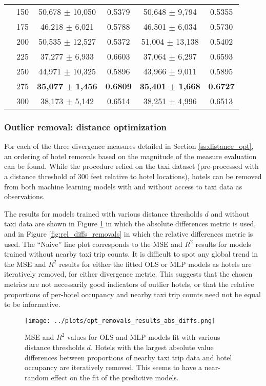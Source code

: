 \documentclass[useAMS, referee, usenatbib]{biom}
\begin{document}
\begin{table}
\begin{center}
{\begin{tabular}{||c|c|c|c|c|c||}
 & 150 & 50,678 $\pm$ 10,050 & 0.5379 & 50,648 $\pm$ 9,794 & 0.5355 \\
 & 175 & 46,218 $\pm$ 6,021 & 0.5788 & 46,501 $\pm$ 6,034 & 0.5730 \\
 & 200 & 50,535 $\pm$ 12,527 & 0.5372 & 51,004 $\pm$ 13,138 & 0.5402 \\
 & 225 & 37,277 $\pm$ 6,933 & 0.6603 & 37,064 $\pm$ 6,297 & 0.6593 \\
 & 250 & 44,971 $\pm$ 10,325 & 0.5896 & 43,966 $\pm$ 9,011 & 0.5895 \\
 & 275 & \textbf{35,077 $\pm$ 1,456} & \textbf{0.6809} & \textbf{35,401 $\pm$ 1,668} & \textbf{0.6727} \\
 & 300 & 38,173 $\pm$ 5,142 & 0.6514 & 38,251 $\pm$ 4,996 & 0.6513 \\
 \hline
\end{tabular}
}
\end{center}
\end{table}

\subsubsection{Outlier removal: distance optimization}
\label{ss:outlier_optimization}

For each of the three divergence measures detailed in Section \ref{ss:distance_opt}, an ordering of hotel removals based on the magnitude of the measure evaluation can be found. While the procedure relied on the taxi dataset (pre-processed with a distance threshold of 300 feet relative to hotel locations), hotels can be removed from both machine learning models with and without access to taxi data as observations.

The results for models trained with various distance thresholds $d$ and without taxi data are shown in Figure \ref{fig:abs_diffs_removals} in which the absolute differences metric is used, and in Figure \ref{fig:rel_diffs_removals} in which the relative differences metric is used. The ``Naive'' line plot corresponds to the MSE and $R^2$ results for models trained without nearby taxi trip counts. It is difficult to spot any global trend in the MSE and $R^2$ results for either the fitted OLS or MLP models as hotels are iteratively removed, for either divergence metric. This suggests that the chosen metrics are not necessarily good indicators of outlier hotels, or that the relative proportions of per-hotel occupancy and nearby taxi trip counts need not be equal to be informative.

\begin{figure}
	\centering
    \captionsetup{justification=centering}
	\texttt{[image: ../plots/opt\_removals\_results\_abs\_diffs.png]}
	\caption{MSE and $R^2$ values for OLS and MLP models fit with various distance thresholds $d$. Hotels with the largest absolute value differences between proportions of nearby taxi trip data and hotel occupancy are iteratively removed. This seems to have a near-random effect on the fit of the predictive models.}
	\label{fig:abs_diffs_removals}
\end{figure}
\end{document}
